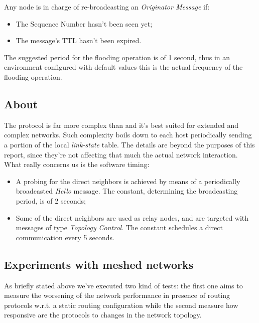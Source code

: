     Any node is in charge of re-broadcasting an \emph{Originator Message} if:
    \begin{itemize}
    \item   The Sequence Number hasn't been seen yet;
    \item   The message's TTL hasn't been expired.
    \end{itemize}

    The suggested period for the flooding operation is of 1 second, thus
    in an environment configured with default values this is the actual
    frequency of the flooding operation.

\subsection{About \olsr}

    The protocol is far more complex than \batman and it's best suited for
    extended and complex networks. Such complexity boils down to
    each host periodically sending a portion of the local \emph{link-state}
    table. The details are beyond the purposes of this report, since
    they're not affecting that much the actual network interaction. What
    really concerns us is the software timing:
    \begin{itemize}
    \item   A probing for the direct neighbors is achieved by means of a
            periodically broadcasted \emph{Hello} message. The
             constant, determining the broadcasting
            period, is of 2 seconds;
    \item   Some of the direct neighbors are used as relay nodes, and are
            targeted with messages of type \emph{Topology Control}.
            The  constant schedules a direct
            communication every 5 seconds.
    \end{itemize}

\subsection{Experiments with meshed networks}
    As briefly stated above we've executed two kind of tests: the
    first one aims to measure the worsening of the network
    performance in presence of routing protocols w.r.t. a static
    routing configuration while the second measure how
    responsive are the protocols to changes in the network topology.

